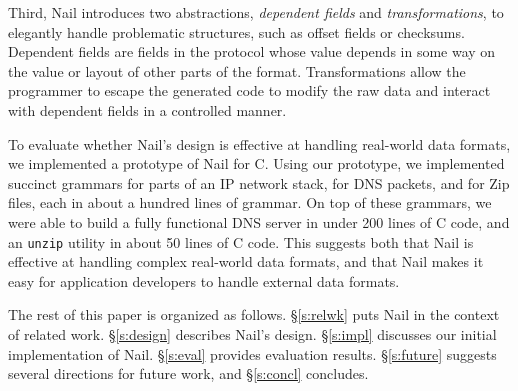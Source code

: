 
Third, Nail introduces two abstractions, \emph{dependent fields} and \emph{transformations}, to
elegantly handle problematic structures, such as offset fields or checksums. Dependent fields are
fields in the protocol whose value depends in some way on the value or layout of other parts of the
format. Transformations allow the programmer to escape the generated code to modify the raw data and
interact with dependent fields in a controlled manner. 

To evaluate whether Nail's design is effective at handling real-world
data formats, we implemented a prototype of Nail for C\@.  Using our
prototype, we implemented succinct grammars for parts of an IP network
stack, for DNS packets, and for Zip files, each in about a hundred lines
of grammar.  On top of these grammars, we were able to build a fully
functional DNS server in under 200 lines of C code, and an {\tt unzip}
utility in about 50 lines of C code.  This suggests both that Nail is
effective at handling complex real-world data formats, and that Nail
makes it easy for application developers to handle external data formats.

The rest of this paper is organized as follows.  \S\ref{s:relwk}
puts Nail in the context of related work.  \S\ref{s:design} describes
Nail's design.  \S\ref{s:impl} discusses our initial implementation
of Nail.  \S\ref{s:eval} provides evaluation results.
\S\ref{s:future} suggests several directions for future work, and
\S\ref{s:concl} concludes.

